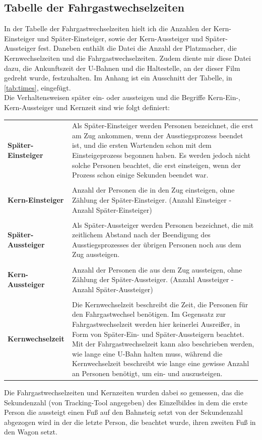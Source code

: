\subsection{Tabelle der Fahrgastwechselzeiten} \label{Zeiten Tabelle}
In der Tabelle der Fahrgastwechselzeiten hielt ich die Anzahlen der Kern-Einsteiger und Später-Einsteiger, sowie der Kern-Aussteiger und Später-Aussteiger fest. Daneben enthält die Datei die Anzahl der Platzmacher, die Kernwechselzeiten und die Fahrgastwechselzeiten.
Zudem diente mir diese Datei dazu, die Ankunftszeit der U-Bahnen und die Haltestelle, an der dieser Film gedreht wurde, festzuhalten. Im Anhang ist ein Ausschnitt der Tabelle, in \tablename \ref{tab:times}, eingefügt. \\
Die Verhaltensweisen später ein- oder aussteigen und die Begriffe Kern-Ein-, Kern-Aussteiger und Kernzeit sind wie folgt definiert:
\begin{longtable}{l p{10.5 cm}}
	\centering
			\textbf{Später-Einsteiger} & Als Später-Einsteiger werden Personen bezeichnet, die erst am Zug ankommen, wenn der Ausstiegsprozess beendet ist, und die ersten Wartenden schon mit dem Einsteigeprozess begonnen haben. Es werden jedoch nicht solche Personen beachtet, die erst einsteigen, wenn der Prozess schon einige Sekunden beendet war.\\
			 & \\
			\textbf{Kern-Einsteiger} & Anzahl der Personen die in den Zug einsteigen, ohne Zählung der Später-Einsteiger. (Anzahl Einsteiger - Anzahl Später-Einsteiger) \\
			 & \\
			 \textbf{Später-Aussteiger} & Als Später-Aussteiger werden Personen bezeichnet, die mit zeitlichem Abstand nach der Beendigung des Ausstiegsprozesses der übrigen Personen noch aus dem Zug aussteigen.\\
			 & \\
			\textbf{Kern-Aussteiger} & Anzahl der Personen die aus dem Zug aussteigen, ohne Zählung der Später-Aussteiger. (Anzahl Aussteiger - Anzahl Später-Aussteiger)\\
			 & \\
			 \textbf{Kernwechselzeit} & Die Kernwechselzeit beschreibt die Zeit, die Personen für den Fahrgastwechsel benötigen. Im Gegensatz zur Fahrgastwechselzeit werden hier keinerlei Ausreißer, in Form von Später-Ein- und Später-Aussteigern beachtet. Mit der Fahrgastwechselzeit kann also beschrieben werden, wie lange eine U-Bahn halten muss, während die Kernwechselzeit beschreibt wie lange eine gewisse Anzahl an Personen benötigt, um ein- und auszusteigen.
\end{longtable}
Die Fahrgastwechselzeiten und Kernzeiten wurden dabei so gemessen, das die Sekundenzahl (von Tracking-Tool angegeben) des Einzelbildes in dem die erste Person die aussteigt einen Fuß auf den Bahnsteig setzt von der Sekundenzahl abgezogen wird in der die letzte Person, die beachtet wurde, ihren zweiten Fuß in den Wagon setzt.

